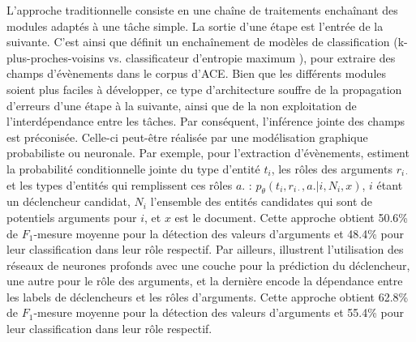 L'approche traditionnelle consiste en une chaîne de traitements enchaînant des modules adaptés à une tâche simple. La sortie d'une étape est l'entrée de la suivante. C'est ainsi que \citet{ahn2006stages} définit un enchaînement de modèles de classification (k-plus-proches-voisins \citep{cover1967knn} vs. classificateur d'entropie maximum \citep{nigam1999maxent}), pour extraire des champs d'évènements dans le corpus d'ACE\citet{ace2005event}. Bien que les différents modules soient plus faciles à développer, ce type d'architecture souffre de la propagation d'erreurs d'une étape à la suivante, ainsi que de la non exploitation de l'interdépendance entre les tâches. Par conséquent, l'inférence jointe des champs est préconisée. Celle-ci peut-être réalisée par une modélisation graphique probabiliste ou neuronale. Par exemple, pour l'extraction d'évènements, \citet{yang2016jointEntityEvt} estiment la probabilité conditionnelle jointe du type d'entité $t_i$, les rôles des arguments $r_{i\cdot}$ et les types d'entités qui remplissent ces rôles $a.$ : $p_\theta(t_i,r_{i\cdot},a. \vert i, N_i, x)$, $i$ étant un déclencheur candidat, $N_i$ l'ensemble des entités candidates qui sont de potentiels arguments pour $i$, et $x$ est le document. Cette approche obtient 50.6\% de $F_1$-mesure moyenne pour la détection des valeurs d'arguments et 48.4\% pour leur classification dans leur rôle respectif. Par ailleurs, \citet{nguyen2016jointtrgarg} illustrent l'utilisation des réseaux de neurones profonds avec une couche pour la prédiction du déclencheur, une autre pour le rôle des arguments, et la dernière encode la dépendance entre les labels de déclencheurs et les rôles d'arguments. Cette approche obtient 62.8\% de $F_1$-mesure moyenne pour la détection des valeurs d'arguments et 55.4\% pour leur classification dans leur rôle respectif. %

